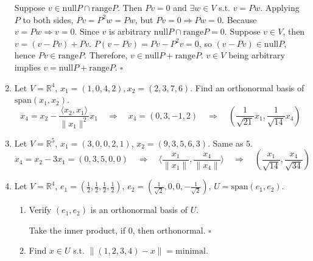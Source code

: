 \documentclass[12pt]{article}
\newenvironment{proof}{\noindent{\bf Proof.}}{\hfill $\square$\medskip}
\begin{document}
\begin{enumerate}
    \begin{proof}
        Suppose $v\in\text{null}P\cap\text{range}P$. Then $Pv=0$ and $\exists w\in V$ s.t. $v=Pw$. Applying $P$ to both sides, $Pv=P^{2}w=Pw$, but $Pv=0\Rightarrow Pw=0$. Because $v=Pw\Rightarrow v=0$. Since $v$ is arbitrary $\text{null}P\cap\text{range}P=0$. Suppose $v\in V$, then $v=(v-Pv)+Pv$. $P(v-Pv)=Pv-P^{2}v=0$, so $(v-Pv)\in\text{null}P$, hence $Pv\in\text{range}P$. Therefore, $v\in\text{null}P+\text{range}P$. $v\in V$ being arbitrary implies $v=\text{null}P+\text{range}P$.
    \end{proof}

    \item Let $V=\mathbb{R}^{4}$, $x_{1}=(1,0,4,2), x_{2}=(2,3,7,6)$. Find an orthonormal basis of $\text{span}(x_{1},x_{2})$.
    $$x_{4}=x_{2}-\frac{\langle x_{2},x_{1}\rangle}{\lVert x_{1}\rVert^{2}}x_{1}\quad\Rightarrow\quad x_{4}=(0,3,-1,2)\quad\Rightarrow\quad (\frac{1}{\sqrt{21}}x_{1},\frac{1}{\sqrt{14}}x_{4})$$

    \item Let $V=\mathbb{R}^{5}$, $x_{1}=(3,0,0,2,1)$, $x_{2}=(9,3,5,6,3)$. Same as $5$.
    $$x_{4}=x_{2}-3x_{1}=(0,3,5,0,0)\quad\Rightarrow\quad\langle\frac{x_{1}}{\lVert x_{1}\rVert},\frac{x_{4}}{\lVert x_{4}\rVert}\rangle\quad\Rightarrow\quad\left(\frac{x_{1}}{\sqrt{14}},\frac{x_{4}}{\sqrt{34}}\right)$$

    \item Let $V=\mathbb{R}^{4}$, $e_{1}=(\frac{1}{2},\frac{1}{2},\frac{1}{2},\frac{1}{2})$, $e_{2}=(\frac{1}{\sqrt{2}},0,0,-\frac{1}{\sqrt{2}})$, $U=\text{span}(e_{1},e_{2})$.
        \begin{enumerate}[label=(\roman*)]
            \item Verify $(e_{1},e_{2})$ is an orthonormal basis of $U$.

            \begin{proof}
                Take the inner product, if $0$, then orthonormal.
            \end{proof}
            \item Find $x\in U$ s.t. $\lVert(1,2,3,4)-x\rVert=\text{minimal}$.


\end{enumerate}
\end{enumerate}
\end{document}
